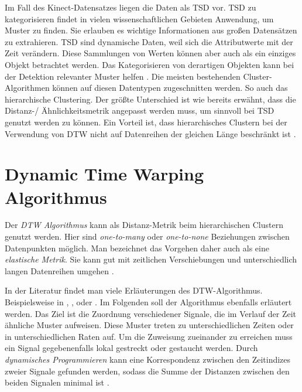 Im Fall des Kinect-Datensatzes liegen die Daten als \ac{TSD} vor.
\ac{TSD} zu kategorisieren findet in vielen wissenschaftlichen Gebieten Anwendung, um Muster zu finden.
Sie erlauben es wichtige Informationen aus großen Datensätzen zu extrahieren.
\ac{TSD} sind dynamische Daten, weil sich die Attributwerte mit der Zeit verändern.
Diese Sammlungen von Werten können aber auch als ein einziges Objekt betrachtet werden.
Das Kategorisieren von derartigen Objekten kann bei der Detektion relevanter Muster helfen \citep{aghabozorgi_time-series_2015}.
Die meisten bestehenden Cluster-Algorithmen können auf diesen Datentypen zugeschnitten werden.
So auch das hierarchische Clustering.
Der größte Unterschied ist wie bereits erwähnt, dass die Distanz-/ Ähnlichkeitsmetrik angepasst werden muss,
um sinnvoll bei \ac{TSD} genutzt werden zu können.
Ein Vorteil ist, dass hierarchisches Clustern bei der Verwendung von \ac{DTW}
nicht auf Datenreihen der gleichen Länge beschränkt ist \citep{warren_liao_clustering_2005}.


\section{Dynamic Time Warping Algorithmus}
\label{3-DTW}
Der \emph{\ac{DTW} Algorithmus} kann als Distanz-Metrik beim hierarchischen Clustern genutzt werden.
Hier sind \emph{one-to-many} oder \emph{one-to-none} Beziehungen zwischen Datenpunkten möglich.
Man bezeichnet das Vorgehen daher auch als eine \emph{elastische Metrik}.
Sie kann gut mit zeitlichen Verschiebungen und unterschiedlich langen Datenreihen umgehen \citep{aghabozorgi_time-series_2015}.

In der Literatur findet man viele Erläuterungen des \ac{DTW}-Algorithmus.
Beispielsweise in \citet{mohammadzade_dynamic_2021}, \citet{warren_liao_clustering_2005},
\citet{aghabozorgi_time-series_2015} oder \citet{yu_dynamic_2019}.
Im Folgenden soll der Algorithmus ebenfalls erläutert werden.
Das Ziel ist die Zuordnung verschiedener Signale,
die im Verlauf der Zeit ähnliche Muster aufweisen.
Diese Muster treten zu unterschiedlichen Zeiten oder in unterschiedlichen Raten auf.
Um die Zuweisung zueinander zu erreichen muss ein Signal gegebenenfalls lokal gestreckt oder gestaucht werden.
Durch \emph{dynamisches Programmieren} kann eine Korrespondenz zwischen den Zeitindizes zweier Signale gefunden werden,
sodass die Summe der Distanzen zwischen den beiden Signalen minimal ist \citep{mohammadzade_dynamic_2021}.

